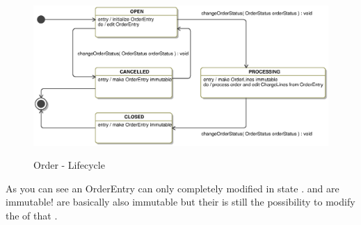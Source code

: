 \vskip 1cm
\begin{figure}[ht]
	\centering
  \includegraphics[scale =.7]{images/OrderEntryState.eps}
	\label{order_statemachine}
	\caption{Order - Lifecycle}
\end{figure}  

As you can see an OrderEntry can only completely modified in state .  and   are immutable!   are basically also immutable but their is still the possibility to modify the  of that . 
